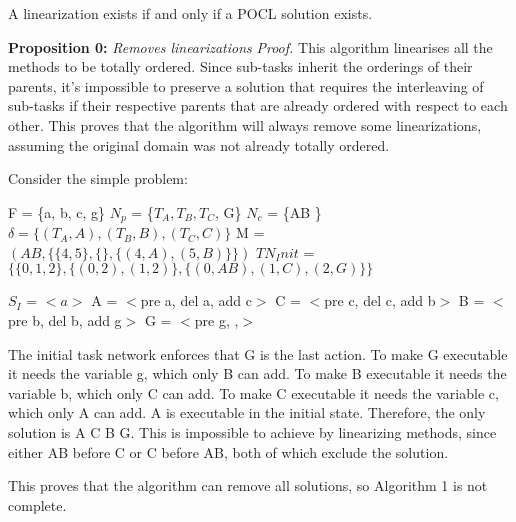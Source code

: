 A linearization exists if and only if a POCL solution exists.


\textbf{Proposition 0:} \textit{Removes linearizations} \newline
\textit{Proof.}
This algorithm linearises all the methods to be totally ordered. Since sub-tasks inherit the orderings of their parents, it's impossible to preserve a solution that requires the interleaving of sub-tasks if their respective parents that are already ordered with respect to each other. This proves that the algorithm will always remove some linearizations, assuming the original domain was not already totally ordered.

Consider the simple problem:

F = \{a, b, c, g\}                                                           \newline
$N_p$ = \{$T_A, T_B, T_C$, G\}                                               \newline
$N_c$ = \{AB \}                                                               \newline
$\delta = \{ (T_A, A), (T_B, B), (T_C, C) \}$                                 \newline
M = $(AB,  \{ \{4,5\}, \{\}, \{(4,A), (5,B)\} \} )$                            \newline
$TN_Init$ = $\{ \{0,1,2\},  \{(0,2), (1,2)\}, \{(0,AB), (1,C), (2,G)\} \}$     \newline
	
	
$S_I$ = $<a>$	
	A = $<$pre a, del a, add c$>$          \newline
	C = $<$pre c, del c, add b$>$          \newline
	B = $<$pre b, del b, add g$>$          \newline
	G = $<$pre g, ,$>$                    \newline
	
	The initial task network enforces that G is the last action.
	To make G executable it needs the variable g, which only B can add.
	To make B executable it needs the variable b, which only C can add.
	To make C executable it needs the variable c, which only A can add.
	A is executable in the initial state.
	Therefore, the only solution is A C B G. This is impossible to achieve by linearizing methods, since either AB before C or C before AB, both of which exclude the solution. 
	
	This proves that the algorithm can remove all solutions, so Algorithm 1 is not complete.
	
